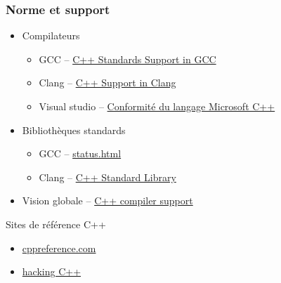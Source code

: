 \documentclass[C++.tex]{subfiles}
\begin{document}
\begin{frame}[fragile]
	\frametitle{Norme et support}
	\begin{itemize}
		\item Compilateurs
		\begin{itemize}
			\item GCC -- \href{https://gcc.gnu.org/projects/cxx-status.html}{C++ Standards Support in GCC}
			\item Clang -- \href{http://clang.llvm.org/cxx_status.html}{C++ Support in Clang}
			\item Visual studio -- \href{https://docs.microsoft.com/fr-fr/cpp/overview/visual-cpp-language-conformance?view=msvc-160}{Conformité du langage Microsoft C++}
		\end{itemize}
		\item Bibliothèques standards
		\begin{itemize}
			\item GCC -- \href{https://gcc.gnu.org/onlinedocs/libstdc++/manual/status.html}{status.html}
			\item Clang -- \href{https://libcxx.llvm.org/}{C++ Standard Library}
		\end{itemize}
		\item Vision globale -- \href{http://en.cppreference.com/w/cpp/compiler_support}{C++ compiler support}
	\end{itemize}

	\begin{block}{Sites de référence C++}
		\begin{itemize}
			\item \href{https://en.cppreference.com/w/}{cppreference.com}
			\item \href{https://hackingcpp.com/}{hacking C++}
		\end{itemize}
	\end{block}
\end{frame}
\end{document}
